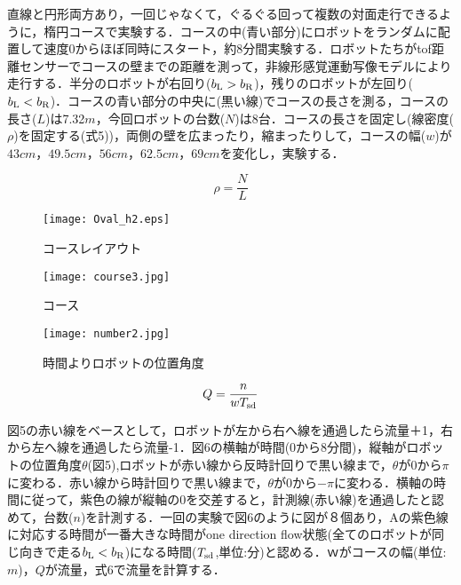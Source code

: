 直線と円形両方あり，一回じゃなくて，ぐるぐる回って複数の対面走行できるように，楕円コースで実験する．コースの中(青い部分)にロボットをランダムに配置して速度0からほぼ同時にスタート，約8分間実験する．ロボットたちがtof距離センサーでコースの壁までの距離を測って，非線形感覚運動写像モデルにより走行する．半分のロボットが右回り($b_{\rm L}>b_{\rm R}$)，残りのロボットが左回り($b_{\rm L}<b_{\rm R}$)．コースの青い部分の中央に(黒い線)でコースの長さを測る，コースの長さ($L$)は7.32$m$，今回ロボットの台数($N$)は8台．コースの長さを固定し(線密度($\rho$)を固定する(式5))，両側の壁を広まったり，縮まったりして，コースの幅($w$)が$43cm$，$49.5cm$，$56cm$，$62.5cm$，$69cm$を変化し，実験する．

\begin{equation}
\rho = \frac{N}{L}
\end{equation}

\begin{figure}[!ht]
    \centering
    \texttt{[image: Oval\_h2.eps]}
    \caption{コースレイアウト}
\end{figure}


\begin{figure}[h]
    \begin{minipage}{0.48\linewidth}
        \centering
        \texttt{[image: course3.jpg]}
        \caption{コース}
    \end{minipage}
    \begin{minipage}{0.48\linewidth}
        \centering
        \texttt{[image: number2.jpg]}
        \caption{時間よりロボットの位置角度}
    \end{minipage}
\end{figure}

\begin{equation}
Q = \frac{n}{wT_{\rm sd}}
\end{equation}

図5の赤い線をベースとして，ロボットが左から右へ線を通過したら流量＋1，右から左へ線を通過したら流量-1．図6の横軸が時間(0から8分間)，縦軸がロボットの位置角度$\theta$(図5),ロボットが赤い線から反時計回りで黒い線まで，$\theta$が0から$\pi$に変わる．赤い線から時計回りで黒い線まで，$\theta$が0から$-\pi$に変わる．横軸の時間に従って，紫色の線が縦軸の0を交差すると，計測線(赤い線)を通過したと認めて，台数($n$)を計測する．一回の実験で図6のように図が８個あり，Aの紫色線に対応する時間が一番大きな時間がone direction flow状態(全てのロボットが同じ向きで走る$b_{\rm L}<b_{\rm R}$)になる時間($T_{\rm sd}$,単位:分)と認める．$ｗ$がコースの幅(単位:$m$)，$Q$が流量，式6で流量を計算する．

